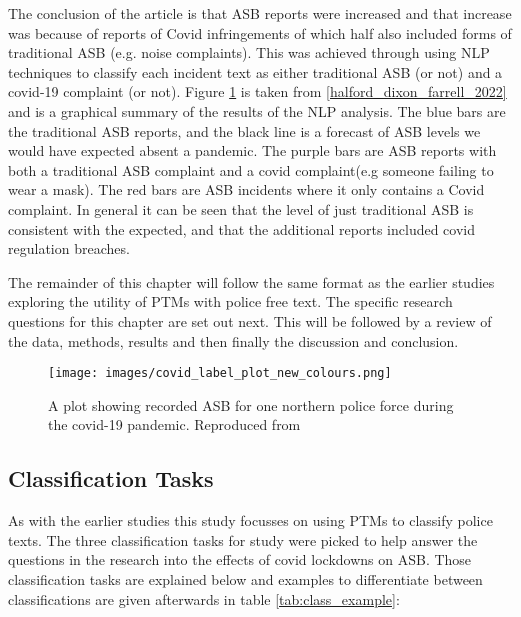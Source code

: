 The conclusion of the article is that ASB reports were increased and that increase was  because of reports of Covid infringements of which half also included forms of traditional ASB (e.g. noise complaints). This was achieved through using NLP techniques to classify each incident text as either traditional ASB (or not) and a covid-19 complaint (or not). Figure \ref{fig:ASB}  is taken from \ref{halford_dixon_farrell_2022} and is a graphical summary of the results of the NLP analysis. The blue bars are the traditional ASB reports, and the black line is a forecast of ASB levels we would have expected absent a pandemic. The purple bars are ASB reports with both a traditional ASB complaint and a covid complaint(e.g someone failing to wear a mask). The red bars are ASB incidents where it only contains a Covid complaint. In general it can be seen that the level of just traditional ASB is consistent with the expected, and that the additional reports included covid regulation breaches.

The remainder of this chapter will follow the same format as the earlier studies exploring the utility of PTMs with police free text. The specific research questions for this chapter are set out next. This will be followed by a review of the data, methods, results and then finally the discussion and conclusion.


\begin{figure}
  \texttt{[image: images/covid\_label\_plot\_new\_colours.png]}
  \caption[ASB in the Pandemic]{A plot showing recorded ASB for one northern police force during the covid-19 pandemic.  Reproduced from  \textcite{halford_dixon_farrell_2022} }
  \label{fig:ASB}
\end{figure}

\subsection{Classification Tasks} As with the earlier studies this study focusses on using PTMs to classify police texts. The three classification tasks for study were picked to help answer the questions in the research into the effects of covid lockdowns on ASB. Those classification tasks are explained below and examples to differentiate between classifications are given afterwards in table \ref{tab:class_example}:

